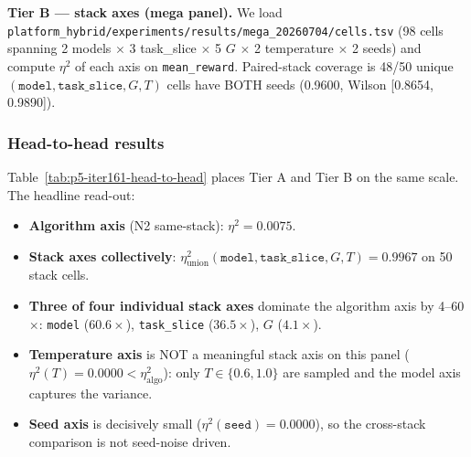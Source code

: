 \textbf{Tier B --- stack axes (mega panel).} We load
\texttt{platform_hybrid/experiments/results/mega\_20260704/cells.tsv} (98 cells
spanning 2 models $\times$ 3 task\_slice $\times$ 5 $G$ $\times$ 2
temperature $\times$ 2 seeds) and compute $\eta^2$ of each axis on
\texttt{mean\_reward}. Paired-stack coverage is 48/50 unique
$(\texttt{model},\texttt{task\_slice},G,T)$ cells have BOTH seeds
(0.9600, Wilson [0.8654, 0.9890]).

\subsubsection{Head-to-head results}
\label{sec:p5-iter161-head-to-head}
Table~\ref{tab:p5-iter161-head-to-head} places Tier A and Tier B on
the same scale. The headline read-out:

\begin{itemize}
\item \textbf{Algorithm axis} (N2 same-stack): $\eta^2 = 0.0075$.
\item \textbf{Stack axes collectively}: $\eta^2_{\mathrm{union}}(\texttt{model},\texttt{task\_slice},G,T) = 0.9967$ on 50 stack cells.
\item \textbf{Three of four individual stack axes} dominate the algorithm axis by 4--60$\times$: \texttt{model} ($60.6\times$), \texttt{task\_slice} ($36.5\times$), $G$ ($4.1\times$).
\item \textbf{Temperature axis} is NOT a meaningful stack axis on this panel ($\eta^2(T) = 0.0000 < \eta^2_{\mathrm{algo}}$): only $T \in \{0.6, 1.0\}$ are sampled and the model axis captures the variance.
\item \textbf{Seed axis} is decisively small ($\eta^2(\texttt{seed}) = 0.0000$), so the cross-stack comparison is not seed-noise driven.
\end{itemize}

